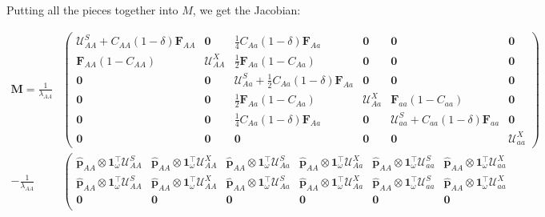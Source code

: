 \documentclass[11pt]{article}
\def\mbf#1{\mathbf{#1}}
\def\mcal#1{\mathcal{#1}}
\begin{document}
Putting all the pieces together into $M$, we get the Jacobian:

\begin{landscape}

\begin{align*} \label{eq:combinedM}
	\mbf{M} = 
		\frac{1}{\lambda_{AA}} &\left(\begin{array}{cc|cc|cc}
				\mcal{U}^S_{AA} + C_{AA} (1 - \delta) \mbf{F}_{AA} & \mbf{0} & \frac{1}{4} C_{Aa} (1 - \delta) \mbf{F}_{Aa} & \mbf{0} & \mbf{0} & \mbf{0} \\ 
				\mbf{F}_{AA} (1 - C_{AA}) & \mcal{U}^X_{AA} & \frac{1}{2} \mbf{F}_{Aa} (1 - C_{Aa}) & \mbf{0} & \mbf{0} & \mbf{0} \\ \hline
				\mbf{0} & \mbf{0} & \mcal{U}^S_{Aa} + \frac{1}{2} C_{Aa} (1 - \delta) \mbf{F}_{Aa} & \mbf{0} & \mbf{0} & \mbf{0} \\
				\mbf{0} & \mbf{0} & \frac{1}{2} \mbf{F}_{Aa} (1 - C_{Aa}) & \mcal{U}^X_{Aa} & \mbf{F}_{aa} (1 - C_{aa}) & \mbf{0}\\ \hline
				\mbf{0} & \mbf{0} & \frac{1}{4} C_{Aa} (1 - \delta) \mbf{F}_{Aa} & \mbf{0} & \mcal{U}^S_{aa} + C_{aa} (1 - \delta) \mbf{F}_{aa} & \mbf{0} \\ 
				\mbf{0} & \mbf{0} & \mbf{0}  & \mbf{0} & \mbf{0} & \mcal{U}^X_{aa}
			\end{array} \right) \\
		-\frac{1}{\lambda_{AA}} &\left(
			\begin{array}{cc|cc|cc}
				\hat{\mbf{p}}_{AA} \otimes \mbf{1}^{\intercal}_{\omega} \mcal{U}^S_{AA} & \hat{\mbf{p}}_{AA} \otimes \mbf{1}^{\intercal}_{\omega} \mcal{U}^X_{AA} & \hat{\mbf{p}}_{AA} \otimes \mbf{1}^{\intercal}_{\omega} \mcal{U}^S_{Aa} & \hat{\mbf{p}}_{AA} \otimes \mbf{1}^{\intercal}_{\omega} \mcal{U}^X_{Aa} & \hat{\mbf{p}}_{AA} \otimes \mbf{1}^{\intercal}_{\omega} \mcal{U}^S_{aa} & \hat{\mbf{p}}_{AA} \otimes \mbf{1}^{\intercal}_{\omega} \mcal{U}^X_{aa} \\ 
				\hat{\mbf{p}}_{AA} \otimes \mbf{1}^{\intercal}_{\omega} \mcal{U}^S_{AA} & \hat{\mbf{p}}_{AA} \otimes \mbf{1}^{\intercal}_{\omega} \mcal{U}^X_{AA} & \hat{\mbf{p}}_{AA} \otimes \mbf{1}^{\intercal}_{\omega} \mcal{U}^S_{Aa} & \hat{\mbf{p}}_{AA} \otimes \mbf{1}^{\intercal}_{\omega} \mcal{U}^X_{Aa} & \hat{\mbf{p}}_{AA} \otimes \mbf{1}^{\intercal}_{\omega} \mcal{U}^S_{aa} & \hat{\mbf{p}}_{AA} \otimes \mbf{1}^{\intercal}_{\omega} \mcal{U}^X_{aa} \\ \hline
				\mbf{0} & \mbf{0} & \mbf{0} & \mbf{0} & \mbf{0} & \mbf{0} \\

\end{array}
\end{align*}
\end{landscape}
\end{document}
